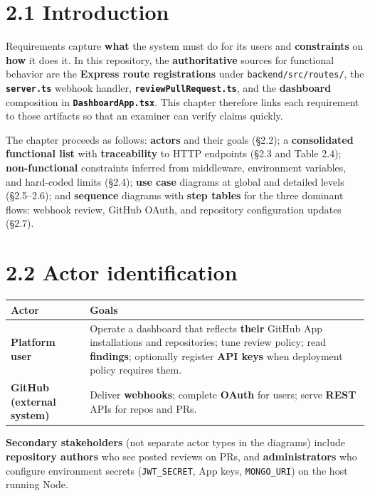 \documentclass[11pt,a4paper]{report}
\begin{document}
\section{2.1 Introduction}


Requirements capture \textbf{what} the system must do for its users and \textbf{constraints} on \textbf{how} it does it. In this repository, the \textbf{authoritative} sources for functional behavior are the \textbf{Express route registrations} under \texttt{backend/src/routes/}, the \textbf{\texttt{server.ts}} webhook handler, \textbf{\texttt{reviewPullRequest.ts}}, and the \textbf{dashboard} composition in \textbf{\texttt{DashboardApp.tsx}}. This chapter therefore links each requirement to those artifacts so that an examiner can verify claims quickly.


The chapter proceeds as follows: \textbf{actors} and their goals (§2.2); a \textbf{consolidated functional list} with \textbf{traceability} to HTTP endpoints (§2.3 and Table 2.4); \textbf{non-functional} constraints inferred from middleware, environment variables, and hard-coded limits (§2.4); \textbf{use case} diagrams at global and detailed levels (§2.5–2.6); and \textbf{sequence} diagrams with \textbf{step tables} for the three dominant flows: webhook review, GitHub OAuth, and repository configuration updates (§2.7).


\section{2.2 Actor identification}


\begingroup\small
\begin{tabular}{@{}p{}p{}@{}}
\toprule
Actor & Goals \\
\midrule
\textbf{Platform user} & Operate a dashboard that reflects \textbf{their} GitHub App installations and repositories; tune review policy; read \textbf{findings}; optionally register \textbf{API keys} when deployment policy requires them. \\
\textbf{GitHub (external system)} & Deliver \textbf{webhooks}; complete \textbf{OAuth} for users; serve \textbf{REST} APIs for repos and PRs. \\
\bottomrule
\end{tabular}
\endgroup


\textbf{Secondary stakeholders} (not separate actor types in the diagrams) include \textbf{repository authors} who see posted reviews on PRs, and \textbf{administrators} who configure environment secrets (\texttt{JWT\_SECRET}, App keys, \texttt{MONGO\_URI}) on the host running Node.
\end{document}
